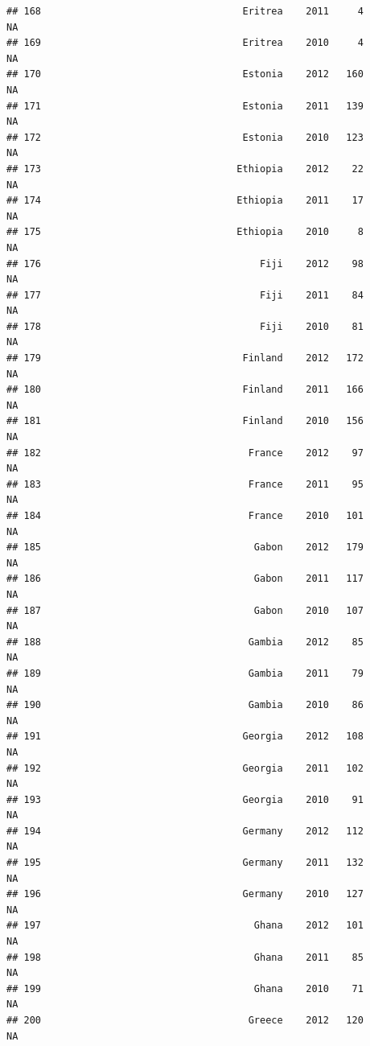 \documentclass[
]{book}
\begin{document}
\begin{verbatim}
## 168                                   Eritrea    2011     4              NA
## 169                                   Eritrea    2010     4              NA
## 170                                   Estonia    2012   160              NA
## 171                                   Estonia    2011   139              NA
## 172                                   Estonia    2010   123              NA
## 173                                  Ethiopia    2012    22              NA
## 174                                  Ethiopia    2011    17              NA
## 175                                  Ethiopia    2010     8              NA
## 176                                      Fiji    2012    98              NA
## 177                                      Fiji    2011    84              NA
## 178                                      Fiji    2010    81              NA
## 179                                   Finland    2012   172              NA
## 180                                   Finland    2011   166              NA
## 181                                   Finland    2010   156              NA
## 182                                    France    2012    97              NA
## 183                                    France    2011    95              NA
## 184                                    France    2010   101              NA
## 185                                     Gabon    2012   179              NA
## 186                                     Gabon    2011   117              NA
## 187                                     Gabon    2010   107              NA
## 188                                    Gambia    2012    85              NA
## 189                                    Gambia    2011    79              NA
## 190                                    Gambia    2010    86              NA
## 191                                   Georgia    2012   108              NA
## 192                                   Georgia    2011   102              NA
## 193                                   Georgia    2010    91              NA
## 194                                   Germany    2012   112              NA
## 195                                   Germany    2011   132              NA
## 196                                   Germany    2010   127              NA
## 197                                     Ghana    2012   101              NA
## 198                                     Ghana    2011    85              NA
## 199                                     Ghana    2010    71              NA
## 200                                    Greece    2012   120              NA

\end{verbatim}
\end{document}
